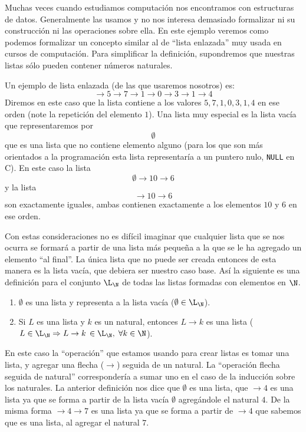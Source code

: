 \begin{ejemplo}
Muchas veces cuando estudiamos computación nos encontramos con estructuras de datos.
Generalmente las usamos y no nos interesa demasiado formalizar ni su construcción ni las operaciones sobre ella.
En este ejemplo veremos como podemos formalizar un concepto similar al de ``lista enlazada'' muy usada en cursos de computación. 
Para simplificar la definición, supondremos que nuestras listas sólo pueden contener números naturales.

Un ejemplo de lista enlazada (de las que usaremos nosotros) es:
\[
\rightarrow 5\rightarrow 7\rightarrow 1\rightarrow 0\rightarrow 3\rightarrow 1\rightarrow 4
\]
Diremos en este caso que la lista contiene a los valores $5, 7, 1, 0, 3, 1, 4$ en ese orden (note la repetición del elemento $1$).
Una lista muy especial es la lista vacía que representaremos por
\[
\emptyset
\]
que es una lista que no contiene elemento alguno (para los que son más orientados a la programación esta lista representaría a un puntero nulo, \texttt{NULL} en C).
En este caso la lista
\[
\emptyset\rightarrow 10\rightarrow 6
\]
y la lista
\[
\rightarrow 10\rightarrow 6
\]
son exactamente iguales, ambas contienen exactamente a los elementos $10$ y $6$ en ese orden.

Con estas consideraciones no es difícil imaginar que cualquier lista que se nos ocurra se formará a partir de una lista más pequeña a la que se le ha agregado un elemento ``al final''.
La única lista que no puede ser creada entonces de esta manera es la lista vacía, que debiera ser nuestro caso base.
Así la siguiente es una definición para el conjunto $\L_\N$ de todas las listas formadas con elementos en $\N$.
\begin{enumerate}
\itemsep 0pt
\item $\emptyset$ es una lista y representa a la lista vacía ($\emptyset\in\L_\N$).
\item Si $L$ es una lista y $k$ es un natural, entonces $L\rightarrow k$ es una lista ($L\in\L_\N\Rightarrow L\rightarrow k\,\in\L_\N,\;\forall k\in\N$).
\end{enumerate}

En este caso la ``operación'' que estamos usando para crear listas es tomar una lista, y agregar una flecha ($\rightarrow$) seguida de un natural.
La ``operación flecha seguida de natural'' correspondería a sumar uno en el caso de la inducción sobre los naturales.
La anterior definición nos dice que $\emptyset$ es una lista, que $\rightarrow 4$ es una lista ya que se forma a partir de la lista vacía $\emptyset$ agregándole el natural $4$.
De la misma forma $\rightarrow 4\rightarrow 7$ es una lista ya que se forma a partir de $\rightarrow 4$ que sabemos que es una lista, al agregar el natural $7$.


\end{ejemplo}

